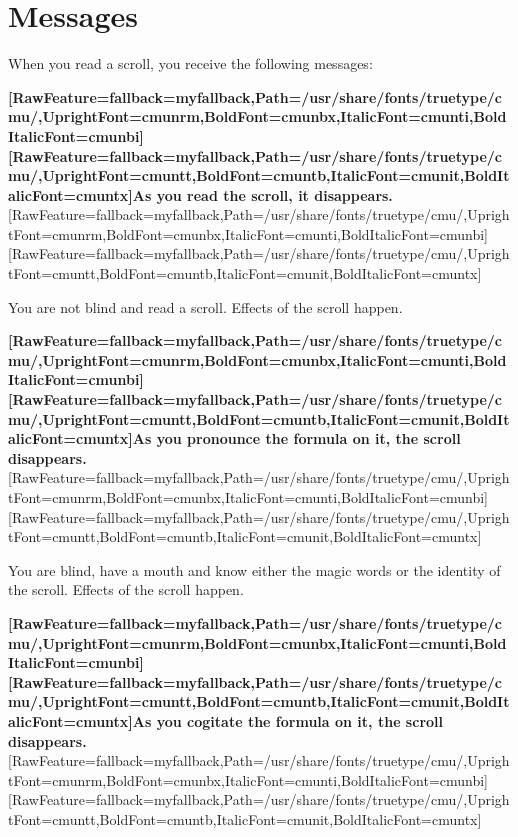 \section{Messages}
\label{15}
When you read a scroll, you receive the following messages:



{\bfseries \allowbreak{}\setmainfont{cmunbx.ttf}[RawFeature={fallback=myfallback},Path=/usr/share/fonts/truetype/cmu/,UprightFont=cmunrm,BoldFont=cmunbx,ItalicFont=cmunti,BoldItalicFont=cmunbi]\setmonofont{cmunbx.ttf}[RawFeature={fallback=myfallback},Path=/usr/share/fonts/truetype/cmu/,UprightFont=cmuntt,BoldFont=cmuntb,ItalicFont=cmunit,BoldItalicFont=cmuntx]\bfseries As you read the scroll, it disappears.}\allowbreak{}\setmainfont{cmunrm.ttf}[RawFeature={fallback=myfallback},Path=/usr/share/fonts/truetype/cmu/,UprightFont=cmunrm,BoldFont=cmunbx,ItalicFont=cmunti,BoldItalicFont=cmunbi]\setmonofont{cmunrm.ttf}[RawFeature={fallback=myfallback},Path=/usr/share/fonts/truetype/cmu/,UprightFont=cmuntt,BoldFont=cmuntb,ItalicFont=cmunit,BoldItalicFont=cmuntx]

\begin{myquote}
\item{}You are not blind and read a scroll. Effects of the scroll happen.
\end{myquote}

{\bfseries \allowbreak{}\setmainfont{cmunbx.ttf}[RawFeature={fallback=myfallback},Path=/usr/share/fonts/truetype/cmu/,UprightFont=cmunrm,BoldFont=cmunbx,ItalicFont=cmunti,BoldItalicFont=cmunbi]\setmonofont{cmunbx.ttf}[RawFeature={fallback=myfallback},Path=/usr/share/fonts/truetype/cmu/,UprightFont=cmuntt,BoldFont=cmuntb,ItalicFont=cmunit,BoldItalicFont=cmuntx]\bfseries As you pronounce the formula on it, the scroll disappears.}\allowbreak{}\setmainfont{cmunrm.ttf}[RawFeature={fallback=myfallback},Path=/usr/share/fonts/truetype/cmu/,UprightFont=cmunrm,BoldFont=cmunbx,ItalicFont=cmunti,BoldItalicFont=cmunbi]\setmonofont{cmunrm.ttf}[RawFeature={fallback=myfallback},Path=/usr/share/fonts/truetype/cmu/,UprightFont=cmuntt,BoldFont=cmuntb,ItalicFont=cmunit,BoldItalicFont=cmuntx]

\begin{myquote}
\item{}You are blind, have a mouth and know either the magic words or the identity of the scroll. Effects of the scroll happen.
\end{myquote}

{\bfseries \allowbreak{}\setmainfont{cmunbx.ttf}[RawFeature={fallback=myfallback},Path=/usr/share/fonts/truetype/cmu/,UprightFont=cmunrm,BoldFont=cmunbx,ItalicFont=cmunti,BoldItalicFont=cmunbi]\setmonofont{cmunbx.ttf}[RawFeature={fallback=myfallback},Path=/usr/share/fonts/truetype/cmu/,UprightFont=cmuntt,BoldFont=cmuntb,ItalicFont=cmunit,BoldItalicFont=cmuntx]\bfseries As you cogitate the formula on it, the scroll disappears.}\allowbreak{}\setmainfont{cmunrm.ttf}[RawFeature={fallback=myfallback},Path=/usr/share/fonts/truetype/cmu/,UprightFont=cmunrm,BoldFont=cmunbx,ItalicFont=cmunti,BoldItalicFont=cmunbi]\setmonofont{cmunrm.ttf}[RawFeature={fallback=myfallback},Path=/usr/share/fonts/truetype/cmu/,UprightFont=cmuntt,BoldFont=cmuntb,ItalicFont=cmunit,BoldItalicFont=cmuntx]

